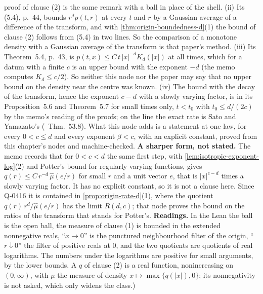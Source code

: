 \begin{proposition}
{proof of clause (2) is the same remark with a ball in place of the shell. (ii) Its (5.4), p.~44,
bounds $r^d p(t,r)$ at every $t$ and $r$ by a Gaussian average of a difference of the transform,
and with \ref{thm:origin-boundedness-d}(1) the bound of clause (2) follows from (5.4) in two
lines. So the comparison of a monotone density with a Gaussian average of the transform is that
paper's method. (iii) Its Theorem~5.4, p.~43, is $p(t,x) \le C\,t\,|x|^{-d}K_d(|x|)$ at all times,
which for a datum with a finite $c$ is an upper bound with the exponent $-d$ (the memo computes
$K_d \le c/2$). So neither this node nor the paper may say that no upper bound on the density
near the centre was known. (iv) The bound with the decay of the transform, hence the exponent
$c - d$ with a slowly varying factor, is in its Proposition~5.6 and Theorem~5.7 for small times
only, $t < t_0$ with $t_0 \le d/(2c)$ by the memo's reading of the proofs; on the line the exact
rate is Sato and Yamazato's (~Thm.~53.8). What this node adds is a statement
at one law, for every $0 < c \le d$ and every exponent $\beta < c$, with an explicit constant,
proved from this chapter's nodes and machine-checked. \textbf{A sharper form, not stated.} The
memo records that for $0 < c < d$ the same first step, with \ref{lem:isotropic-exponent-log}(2)
and Potter's bound for regularly varying functions, gives
$q(r) \le C\,r^{-d}\,\widehat\mu(e/r)$ for small $r$ and a unit vector $e$, that is
$|x|^{c-d}$ times a slowly varying factor. It has no explicit constant, so it is not a clause
here. Since Q-0416 it is contained in \ref{prop:origin-rate-d}(1), where the quotient
$q(r)\,r^{d}/\widehat\mu(e/r)$ has the limit $R(d,c)$; that node proves the bound on the ratios of
the transform that stands for Potter's. \textbf{Readings.} In the Lean the ball is the open ball, the
measure of clause (1) is bounded in the extended nonnegative reals, ``$x \to 0$'' is the punctured
neighbourhood filter of the origin, ``$r \downarrow 0$'' the filter of positive reals at $0$, and
the two quotients are quotients of real logarithms. The numbers under the logarithms are positive
for small arguments, by the lower bounds. A $q$ of clause (2) is a real function, nonincreasing on
$(0,\infty)$, with $\mu$ the measure of density $x \mapsto \max\{q(|x|),0\}$; its nonnegativity is
not asked, which only widens the class.)}
\end{proposition}

